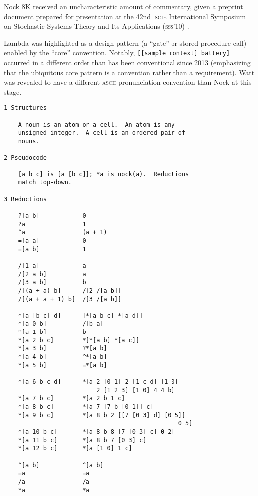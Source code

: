 \documentclass[twoside]{article}
\begin{document}
Nock 8K received an uncharacteristic amount of commentary, given a preprint document prepared for presentation at the 42nd \textsc{iscie} International Symposium on Stochastic Systems Theory and Its Applications (\textsc{sss'10}) \citep{Yarvin2010b}.

\sloppy
Lambda was highlighted as a design pattern (a ``gate'' or stored procedure call) enabled by the ``core'' convention.  \mbox{Notably,} \lstinline[style=listingcode]{[[sample context] battery]} occurred in a different order than has been conventional since 2013 (emphasizing that the ubiquitous core pattern is a convention rather than a requirement).  Watt was revealed to have a different \textsc{ascii} pronunciation convention than Nock at this stage.

\begin{lstlisting}[label=lst:nock8k,caption={Nock 8K, 25 July 2010.},style=listingcode]
1 Structures

    A noun is an atom or a cell.  An atom is any
    unsigned integer.  A cell is an ordered pair of
    nouns.

2 Pseudocode

    [a b c] is [a [b c]]; *a is nock(a).  Reductions
    match top-down.

3 Reductions

    ?[a b]            0
    ?a                1
    ^a                (a + 1)
    =[a a]            0
    =[a b]            1

    /[1 a]            a
    /[2 a b]          a
    /[3 a b]          b
    /[(a + a) b]      /[2 /[a b]]
    /[(a + a + 1) b]  /[3 /[a b]]

    *[a [b c] d]      [*[a b c] *[a d]]
    *[a 0 b]          /[b a]
    *[a 1 b]          b
    *[a 2 b c]        *[*[a b] *[a c]]
    *[a 3 b]          ?*[a b]
    *[a 4 b]          ^*[a b]
    *[a 5 b]          =*[a b]

    *[a 6 b c d]      *[a 2 [0 1] 2 [1 c d] [1 0]
                          2 [1 2 3] [1 0] 4 4 b]
    *[a 7 b c]        *[a 2 b 1 c]
    *[a 8 b c]        *[a 7 [7 b [0 1]] c]
    *[a 9 b c]        *[a 8 b 2 [[7 [0 3] d] [0 5]]
                                                 0 5]
    *[a 10 b c]       *[a 8 b 8 [7 [0 3] c] 0 2]
    *[a 11 b c]       *[a 8 b 7 [0 3] c]
    *[a 12 b c]       *[a [1 0] 1 c]

    ^[a b]            ^[a b]
    =a                =a
    /a                /a
    *a                *a
\end{lstlisting}
\end{document}

